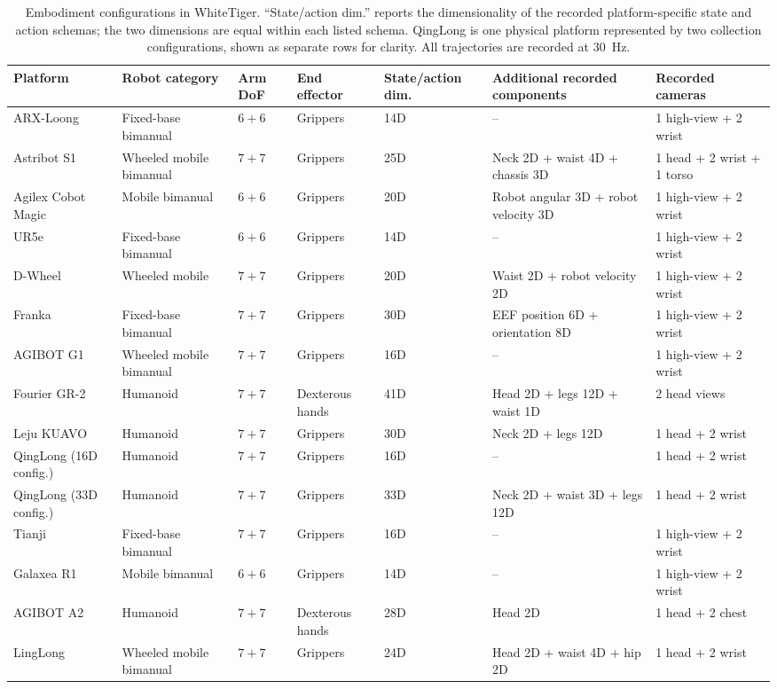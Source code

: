 \begin{table}[t]
\centering
\caption{Embodiment configurations in WhiteTiger. ``State/action dim.'' reports the dimensionality of the recorded platform-specific state and action schemas; the two dimensions are equal within each listed schema. QingLong is one physical platform represented by two collection configurations, shown as separate rows for clarity. All trajectories are recorded at 30~Hz.}
\label{tab:robot-config}
\scriptsize
\renewcommand{\arraystretch}{1.08}
\begin{adjustbox}{max width=\textwidth,center}
\begin{tabular}{lllllll}
\toprule
Platform & Robot category & Arm DoF & End effector & State/action dim. & Additional recorded components & Recorded cameras \\
\midrule
ARX-Loong & Fixed-base bimanual & $6+6$ & Grippers & 14D & -- & 1 high-view + 2 wrist \\
Astribot S1 & Wheeled mobile bimanual & $7+7$ & Grippers & 25D & Neck 2D + waist 4D + chassis 3D & 1 head + 2 wrist + 1 torso \\
Agilex Cobot Magic & Mobile bimanual & $6+6$ & Grippers & 20D & Robot angular 3D + robot velocity 3D & 1 high-view + 2 wrist \\
UR5e & Fixed-base bimanual & $6+6$ & Grippers & 14D & -- & 1 high-view + 2 wrist \\
D-Wheel & Wheeled mobile & $7+7$ & Grippers & 20D & Waist 2D + robot velocity 2D & 1 high-view + 2 wrist \\
Franka & Fixed-base bimanual & $7+7$ & Grippers & 30D & EEF position 6D + orientation 8D & 1 high-view + 2 wrist \\
AGIBOT G1 & Wheeled mobile bimanual & $7+7$ & Grippers & 16D & -- & 1 high-view + 2 wrist \\
Fourier GR-2 & Humanoid & $7+7$ & Dexterous hands & 41D & Head 2D + legs 12D + waist 1D & 2 head views \\
Leju KUAVO & Humanoid & $7+7$ & Grippers & 30D & Neck 2D + legs 12D & 1 head + 2 wrist \\
\addlinespace[1pt]
QingLong (16D config.) & Humanoid & $7+7$ & Grippers & 16D & -- & 1 head + 2 wrist \\
QingLong (33D config.) & Humanoid & $7+7$ & Grippers & 33D & Neck 2D + waist 3D + legs 12D & 1 head + 2 wrist \\
\addlinespace[1pt]
Tianji & Fixed-base bimanual & $7+7$ & Grippers & 16D & -- & 1 high-view + 2 wrist \\
Galaxea R1 & Mobile bimanual & $6+6$ & Grippers & 14D & -- & 1 high-view + 2 wrist \\
AGIBOT A2 & Humanoid & $7+7$ & Dexterous hands & 28D & Head 2D & 1 head + 2 chest \\
LingLong & Wheeled mobile bimanual & $7+7$ & Grippers & 24D & Head 2D + waist 4D + hip 2D & 1 head + 2 wrist \\
\bottomrule
\end{tabular}
\end{adjustbox}
\end{table}
